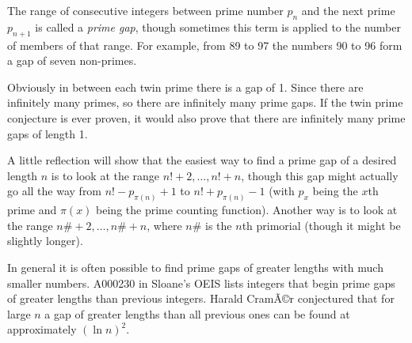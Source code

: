 \documentclass[12pt]{article}
\begin{document}
The range of consecutive integers between prime number $p_n$ and the next prime $p_{n + 1}$ is called a {\em prime gap}, though sometimes this term is applied to the number of members of that range. For example, from 89 to 97 the numbers 90 to 96 form a gap of seven non-primes.

Obviously in between each twin prime there is a gap of 1. Since there are infinitely many primes, so there are infinitely many prime gaps. If the twin prime conjecture is ever proven, it would also prove that there are infinitely many prime gaps of length 1.

A little reflection will show that the easiest way to find a prime gap of a desired length $n$ is to look at the range $n! + 2, \ldots , n! + n$, though this gap might actually go all the way from $n! - p_{\pi(n)} + 1$ to $n! + p_{\pi(n)} - 1$ (with $p_x$ being the $x$th prime and $\pi(x)$ being the prime counting function). Another way is to look at the range $n\# + 2, \ldots , n\# + n$, where $n\#$ is the $n$th primorial (though it might be slightly longer). 

In general it is often possible to find prime gaps of greater lengths with much smaller numbers. A000230 in Sloane's OEIS lists integers that begin prime gaps of greater lengths than previous integers. Harald CramÃ©r conjectured that for large $n$ a gap of greater lengths than all previous ones can be found at approximately $(\ln n)^2$.
\end{document}
